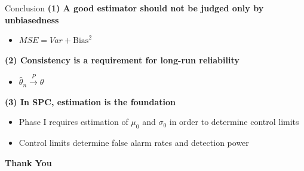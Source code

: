 \documentclass[aspectratio=169,12pt]{beamer}
\begin{document}
\begin{frame}{Conclusion}
    \vspace{0.2cm}
    \textbf{(1) A good estimator should not be judged only by unbiasedness}
    \begin{itemize}
        \item $ MSE= Var+\mathrm{Bias}^2$
    \end{itemize}

    \vspace{0.8em}
    \textbf{(2) Consistency is a requirement for long-run reliability}
    \begin{itemize}
        \item $\hat{\theta}_n \xrightarrow{P} \theta$
    \end{itemize}

    \vspace{0.8em}
    \textbf{(3) In SPC, estimation is the foundation}
    \begin{itemize}
        \item Phase I requires estimation of $\mu_0$ and $\sigma_0$ in order to determine control limits
        \item Control limits determine false alarm rates and detection power
    \end{itemize}
    \vspace{0.8em}
\end{frame}

\begin{frame}
    \centering\Huge{\textbf{Thank You}}
\end{frame}
\end{document}
